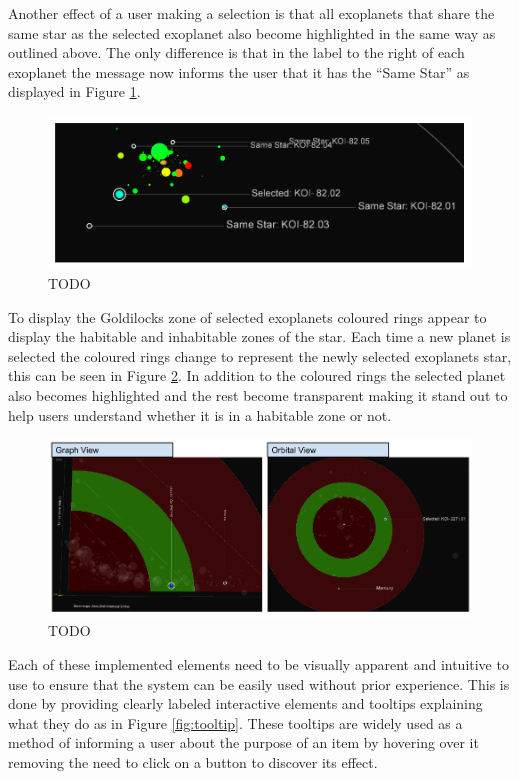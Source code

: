 Another effect of a user making a selection is that all exoplanets that share
the same star as the selected exoplanet also become highlighted in the
same way as outlined above. The only difference is that in the label to the
right
of each exoplanet the message now informs the user that it has the ``Same
Star'' as displayed in Figure \ref{fig:sameStar}.

\begin{figure}[H]
  \centering
      \includegraphics[width=1\textwidth]{images/sameStar.png}
  \caption{TODO~}  
    \label{fig:sameStar}
\end{figure}


To display the Goldilocks zone of selected exoplanets coloured rings appear to
display the habitable
and inhabitable zones of the star. Each time a new planet is selected the
coloured rings change to represent the newly selected exoplanets star, this can
be seen in Figure
\ref{fig:habitable}. In addition to the coloured rings the selected planet also
becomes highlighted
and the rest become transparent making it stand out to help users understand
whether it is in a habitable zone or not.

\begin{figure}[H]
  \centering
      \includegraphics[width=1\textwidth]{images/habitable.png}
  \caption{TODO~}  
    \label{fig:habitable}
\end{figure}

Each of these implemented elements need to be visually apparent and intuitive to
use to ensure that the system can be
easily used without prior experience. This is done by providing clearly
labeled interactive elements and tooltips explaining what they
do as in Figure \ref{fig:tooltip}. These tooltips are widely used as a method of
informing a
user about the purpose of an item by hovering over it removing the need to
click on a button to discover its effect.

